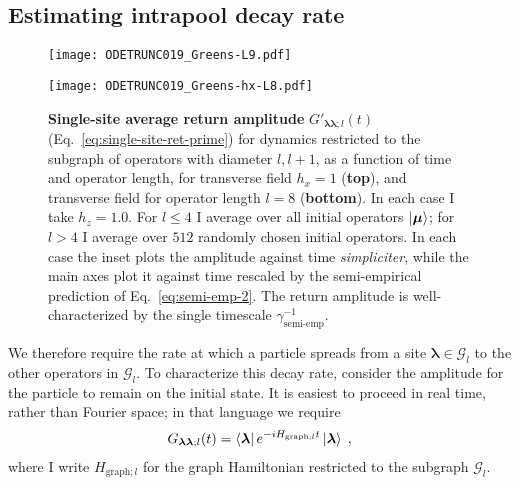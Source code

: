 \documentclass[aps,prb,nofootinbib,twocolumn,balancelastpage,amsmath,amssymb,floatfix,superscriptaddress,]{revtex4-1}
\newcommand{\graph}{\mathrm{graph}}
\newcommand{\pool}{\mathcal G}
\begin{document}
\subsection{Estimating intrapool decay rate}\label{ss:rate-loss-est}

\begin{figure}
  \begin{minipage}{0.45\textwidth}
    \texttt{[image: ODETRUNC019\_Greens-L9.pdf]}
  \end{minipage}
  
  \begin{minipage}{0.45\textwidth}
    \texttt{[image: ODETRUNC019\_Greens-hx-L8.pdf]}
  \end{minipage}

  \caption{\textbf{Single-site average return amplitude} $ G'_{\bm\lambda\bm\lambda;l}(t)$
    (Eq.~\eqref{eq:single-site-ret-prime})
    for dynamics restricted to the subgraph of operators with diameter $l,l+1$,
    as a function of time and operator length,
    for transverse field $h_x = 1$ (\textbf{top}),
    and transverse field for operator length $l = 8$ (\textbf{bottom}).
    In each case I take $h_z = 1.0$.
    For $l \le 4$ I average over all initial operators $\ket{\bm \mu}$;
    for $l > 4$ I average over $512$ randomly chosen initial operators.
    In each case the inset plots the amplitude against time \textit{simpliciter},
    while the main axes plot it against time rescaled by the semi-empirical prediction of Eq.~\eqref{eq:semi-emp-2}.
    The return amplitude is well-characterized by the single timescale $\gamma_{\text{semi-emp}}^{-1}$.
  }
  \label{fig:self-energy-average}
\end{figure}



We therefore require the rate at which a particle spreads from a site $\bm \lambda \in \pool_{l}$
to the other operators in $\pool_l$.
To characterize this decay rate, consider the amplitude for the particle to remain on the initial state.
It is easiest to proceed in real time, rather than Fourier space;
in that language we require
\begin{align}
  \label{eq:ret-ampl-defn}
  G_{\bm\lambda\bm\lambda;l}(t) = \bra{\bm \lambda} e^{-iH_{\graph;l}t}\ket{\bm \lambda}\;,
\end{align}
where I write $H_{\graph;l}$ for the graph Hamiltonian restricted to the subgraph $\pool_l$.
\end{document}
